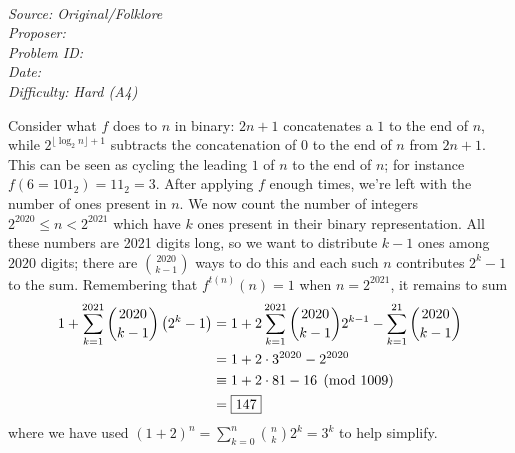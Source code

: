 \SSbreak\\
\emph{Source: Original/Folklore}\\
\emph{Proposer: \Paiya}\\ %
\emph{Problem ID:}\\
\emph{Date: }\\
\emph{Difficulty: Hard (A4)}\\
\SSbreak

\bigskip

\begin{solution}\hfil\medskip
	
    Consider what $f$ does to $n$ in binary: $2n + 1$ concatenates a $1$ to the end of $n$, while 
    $2^{\lfloor \log_2n \rfloor + 1}$ subtracts the concatenation of $0$ to the end of $n$ from $2n + 1$. 
    This can be seen as cycling the leading $1$ of $n$ to the end of $n$; for instance $f\left(6 = 101_2\right) = 11_2 = 3$. 
    After applying $f$ enough times, we're left with the number of ones present in $n$. We now count the number of integers $2^{2020} \leq n < 2^{2021}$
    which have $k$ ones present in their binary representation. All these numbers are 2021 digits long, so we want to distribute $k - 1$ ones among $2020$ digits;
    there are $\binom{2020}{k - 1}$ ways to do this and each such $n$ contributes $2^k - 1$ to the sum. 
    Remembering that $f^{t(n)}(n) = 1$ when $n = 2^{2021}$, it remains to sum 
    \begin{align*}
        1 + \sum_{k = 1}^{2021} \dbinom{2020}{k - 1}\left(2^k - 1\right) &= 1 + 2\sum_{k = 1}^{2021} \dbinom{2020}{k - 1}2^{k - 1} - \sum_{k = 1}^{21} \dbinom{2020}{k - 1} \\
        &= 1 + 2 \cdot 3^{2020} - 2^{2020} \\
        &\equiv 1 + 2 \cdot 81 - 16 \pmod{1009}\\
        &= \boxed{147}
    \end{align*}
    where we have used $(1 + 2)^n = \sum_{k = 0}^n \binom{n}{k} 2^k = 3^k$ to help simplify.
\end{solution}\bigskip
